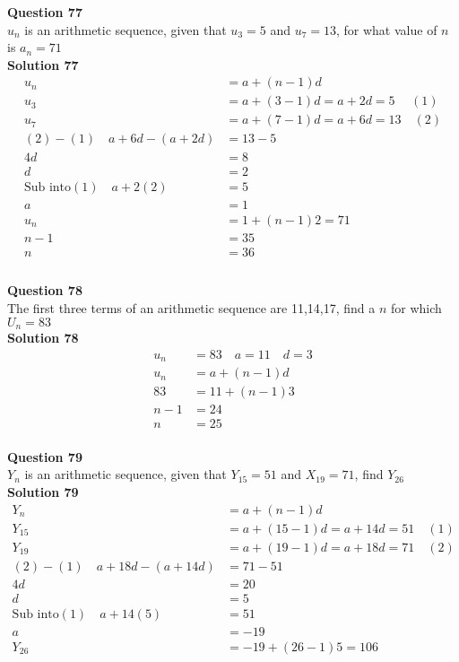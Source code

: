 \documentclass{article}
\begin{document}
\noindent\textbf{Question 77}\\[5pt]
$u_n$ is an arithmetic sequence, given that $u_{3}=5$ and $u_{7}=13$, for what value of $n$ is $a_n=71$\\[5pt]
\noindent\textbf{Solution 77}\\[5pt]
\begin{align*}
u_n&=a+(n-1)d\\[2pt]
u_3&=a+(3-1)d=a+2d=5 \hspace{15pt} (1)\\[2pt]
u_7&=a+(7-1)d=a+6d=13\quad (2) \\[2pt]
(2)-(1)\quad a+6d-(a+2d)&=13-5\\[2pt]
4d&=8\\[2pt]
d&=2\\[12pt]
\text{Sub into} (1) \quad a+2(2)&=5\\[2pt]
a&=1\\[12pt]
u_n&=1+(n-1)2=71\\[2pt]
n-1&=35\\[2pt]
n&=36\\[-60pt]
\end{align*}\\[10pt]

\noindent\textbf{Question 78}\\[5pt]
The first three terms of an arithmetic sequence are 11,14,17, find a $n$ for which $U_n=83$\\[5pt]
\noindent\textbf{Solution 78}\\[5pt]
\begin{align*}
u_n&=83 \quad a=11 \quad d=3\\[2pt]
u_n&=a+(n-1)d\\[2pt]
83&=11+(n-1)3\\[2pt]
n-1&=24\\[2pt]
n&=25
\end{align*}\\[10pt]

\noindent\textbf{Question 79}\\[5pt]
$Y_n$ is an arithmetic sequence, given that $Y_{15}=51$ and $X_{19}=71$, find $Y_{26}$\\[5pt]
\noindent\textbf{Solution 79}\\[5pt]
\begin{align*}
Y_n&=a+(n-1)d\\[2pt]
Y_{15}&=a+(15-1)d=a+14d=51 \quad (1)\\[2pt]
Y_{19}&=a+(19-1)d=a+18d=71\quad (2) \\[2pt]
(2)-(1)\quad a+18d-(a+14d)&=71-51\\[2pt]
4d&=20\\[2pt]
d&=5\\[12pt]
\text{Sub into} (1) \quad a+14(5)&=51\\[2pt]
a&=-19\\[12pt]
Y_{26}&=-19+(26-1)5=106\\[-60pt]
\end{align*}\\[10pt]
\end{document}
